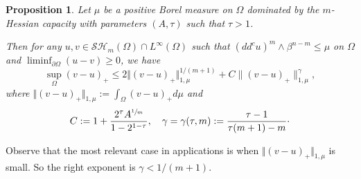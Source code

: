 \documentclass[JEP,XML,SOM,Unicode]{cedram}
\newtheorem{proposition}[theorem]{Proposition}
\theoremstyle{definition}
\begin{document}
\begin{proposition} \label{prop:stability} Let $\mu$ be a positive Borel measure on $\Omega$ dominated by the $m$\nobreakdash-Hessian capacity with parameters $(A, \tau)$ such that $\tau > 1$.

Then for any $u, v \in \mathcal {SH}_m (\Omega) \cap L^{\infty} (\Omega)$ such that $(dd^c u)^m \wedge \beta^{n - m} \leq \mu$ on $\Omega$ and $\liminf_{\partial \Omega} (u - v) \geq 0$, we have
\begin{equation} \label{eq:stability}
\sup_{\Omega} (v - u)_+ \leq 2 \Vert (v-u)_+\Vert_{1,\mu}^{1 \slash (m+1)} + C \|(v-u)_+\|^\gamma_{1,\mu},
\end{equation}
where $\Vert (v-u)_+ \Vert_{1,\mu}:= \int_{\Omega} (v-u)_+ d \mu$ and
\begin{equation} \label{eq:stbilityconstant}
C:= 1 + \frac{2^{\tau} A^{\sfrac{1}{m}}}{1-2^{1 -\tau}}, \quad \gamma = \gamma (\tau,m):= \frac{\tau - 1}{\tau (m + 1) - m }\cdot
\end{equation}
\end{proposition}
Observe that the most relevant case in applications is when $\Vert (v-u)_+ \Vert_{1,\mu}$ is small. So the right exponent is $\gamma < 1 \slash (m +1)$.
\end{document}
